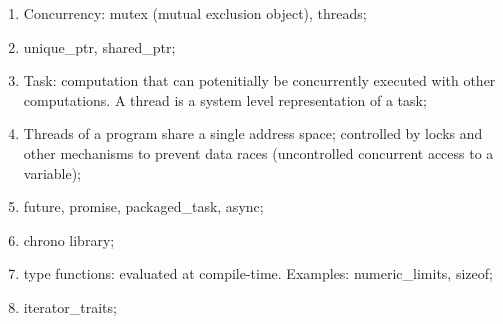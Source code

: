 \documentclass{article}
\begin{document}
\begin{enumerate}

  \item Concurrency: mutex (mutual exclusion object), threads;

  \item unique\_ptr, shared\_ptr;

  \item Task: computation that can potenitially be concurrently executed with
    other computations. A thread is a system level representation of a task;

  \item Threads of a program share a single address space; controlled by locks
    and other mechanisms to prevent data races (uncontrolled concurrent access
    to a variable);

  \item future, promise, packaged\_task, async;

  \item chrono library;

  \item type functions: evaluated at compile-time. Examples: numeric\_limits,
    sizeof;

  \item iterator\_traits;

\end{enumerate}
\end{document}
